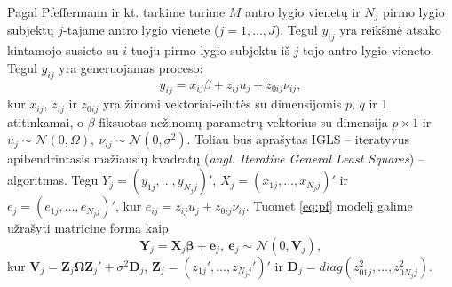 \documentclass[11pt,a4paper]{article}
\begin{document}
\indent Pagal Pfeffermann ir kt. tarkime turime $M$ antro lygio vienetų ir $N_j$ pirmo lygio subjektų $j$-tajame antro lygio vienete ($j=1,\dots,J$). Tegul $y_{ij}$ yra reikšmė atsako kintamojo susieto su $i$-tuoju pirmo lygio subjektu iš $j$-tojo antro lygio vieneto. Tegul $y_{ij}$ yra generuojamas proceso:
\begin{equation*}\label{eq:pf}
y_{ij}=x_{ij}\beta+z_{ij}u_j+z_{0ij}\nu_{ij},
\end{equation*} 
kur $x_{ij}$, $z_{ij}$ ir $z_{0ij}$ yra žinomi vektoriai-eilutės su dimensijomis $p$, $q$ ir 1 atitinkamai, o $\beta$ fiksuotas nežinomų parametrų vektorius su dimensija $p\times1$ ir $u_j\sim \mathcal{N}(0, \Omega),\ \nu_{ij}\sim \mathcal{N}(0, \sigma^2)$. Toliau bus aprašytas IGLS -- iteratyvus apibendrintasis mažiausių kvadratų (\textit{angl. Iterative General Least Squares}) -- algoritmas. Tegu $Y_j = (y_{1j},\dots,y_{N_jj})'$, $X_j=(x_{1j},\dots,x_{N_jj})'$ ir $e_j=(e_{1j},\dots,e_{N_jj})'$, kur $e_{ij}=z_{ij}u_j+z_{0ij}\nu_{ij}$. Tuomet \ref{eq:pf} modelį galime užrašyti matricine forma kaip
\begin{equation*}
\mathbf{Y}_j=\mathbf{X}_j\boldsymbol{\beta}+\mathbf{e}_j, \ \mathbf{e}_j\sim \mathcal{N}(0, \mathbf{V}_j),
\end{equation*}
kur $\mathbf{V}_j=\mathbf{Z}_j\boldsymbol{\Omega} \mathbf{Z}_j'+\sigma^2\mathbf{D}_j$, $\mathbf{Z}_j=(z_{1j}',\dots,z_{N_jj}')'$ ir $\mathbf{D}_j=diag(z_{01j}^2,\dots,z_{0N_jj}^2)$.
\end{document}
